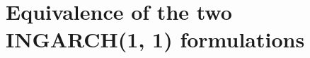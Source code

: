 \documentclass[review]{elsarticle}
\begin{document}
%
%
%
%

\appendix
\section{Equivalence of the two INGARCH(1, 1) formulations}
\label{appendix:proof}
\end{document}
